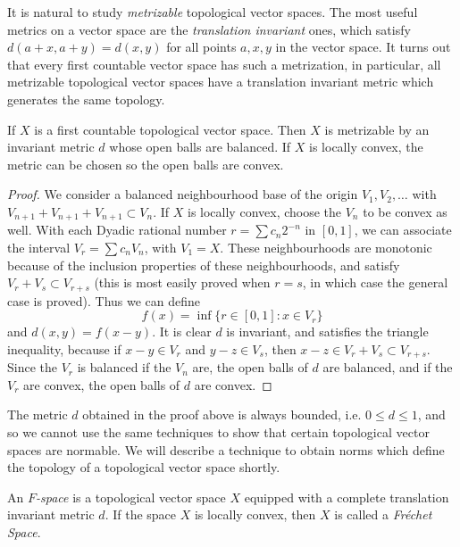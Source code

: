 It is natural to study \emph{metrizable} topological vector spaces. The most useful metrics on a vector space are the \emph{translation invariant} ones, which satisfy $d(a + x, a + y) = d(x,y)$ for all points $a,x,y$ in the vector space. It turns out that every first countable vector space has such a metrization, in particular, all metrizable topological vector spaces have a translation invariant metric which generates the same topology.

\begin{theorem}
    If $X$ is a first countable topological vector space. Then $X$ is metrizable by an invariant metric $d$ whose open balls are balanced. If $X$ is locally convex, the metric can be chosen so the open balls are convex.
\end{theorem}
\begin{proof}
    We consider a balanced neighbourhood base of the origin $V_1, V_2, \dots$ with $V_{n+1} + V_{n+1} + V_{n+1} \subset V_n$. If $X$ is locally convex, choose the $V_n$ to be convex as well. With each Dyadic rational number $r = \sum c_n 2^{-n}$ in $[0,1]$, we can associate the interval $V_r = \sum c_n V_n$, with $V_1 = X$. These neighbourhoods are monotonic because of the inclusion properties of these neighbourhoods, and satisfy $V_r + V_s \subset V_{r+s}$ (this is most easily proved when $r = s$, in which case the general case is proved). Thus we can define
    \[ f(x) = \inf \{ r \in [0,1] : x \in V_r \} \]
    and $d(x,y) = f(x-y)$. It is clear $d$ is invariant, and satisfies the triangle inequality, because if $x - y \in V_r$ and $y - z \in V_s$, then $x - z \in V_r + V_s \subset V_{r + s}$. Since the $V_r$ is balanced if the $V_n$ are, the open balls of $d$ are balanced, and if the $V_r$ are convex, the open balls of $d$ are convex.
\end{proof}

\begin{remark}
    The metric $d$ obtained in the proof above is always bounded, i.e. $0 \leq d \leq 1$, and so we cannot use the same techniques to show that certain topological vector spaces are normable. We will describe a technique to obtain norms which define the topology of a topological vector space shortly.
\end{remark}

An \emph{$F$-space} is a topological vector space $X$ equipped with a complete translation invariant metric $d$. If the space $X$ is locally convex, then $X$ is called a \emph{Fr\'{e}chet Space}.

